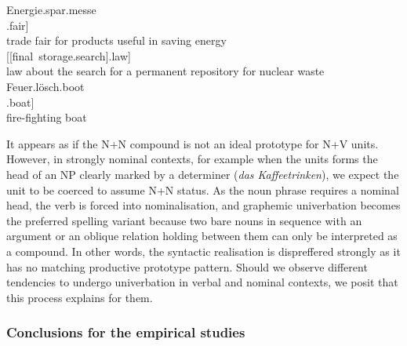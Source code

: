 \documentclass[biblatex, charis, linguex]{glossa}\usepackage{knitr}
\begin{document}
\begin{exe}
  \ex\label{ex:notfuhrhop}\begin{xlist}
    \ex\gll Energie.spar.messe\\
    [[energy.save].fair]\\
    \trans trade fair for products useful in saving energy
    \ex{}\\
    {[[final~storage.search].law]}\\
    \trans law about the search for a permanent repository for nuclear waste
    \ex\gll Feuer.lösch.boot\\
    [[fire.extinguish].boat]\\
    \trans fire-fighting boat
  \end{xlist}
  \ex\label{ex:nnv}
    \begin{xlist}
      \label{ex:nnva}
      \label{ex:nnvb}
    \end{xlist}
\end{exe}

It appears as if the N+N compound is not an ideal prototype for N+V units.
However, in strongly nominal contexts, for example when the units forms the head of an NP clearly marked by a determiner (\textit{das Kaffeetrinken}), we expect the unit to be coerced to assume N+N status.
As the noun phrase requires a nominal head, the verb is forced into nominalisation, and graphemic univerbation becomes the preferred spelling variant because two bare nouns in sequence with an argument or an oblique relation holding between them can only be interpreted as a compound.
In other words, the syntactic realisation is dispreffered strongly as it has no matching productive prototype pattern.
Should we observe different tendencies to undergo univerbation in verbal and nominal contexts, we posit that this process explains for them.

\subsubsection{Conclusions for the empirical studies}
\label{sub:hypothesesfortheempiricalstudies}
\end{document}
